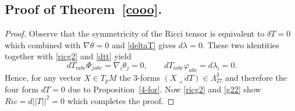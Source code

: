 \documentclass[10pt,british]{article}
\def\sb {{\nabla}}
\def\p{{\varphi}}
\begin{document}
\subsection{Proof of Theorem~\ref{cooo}.}
\begin{proof}
Observe that the symmetricity of the Ricci tensor is equivalent to $\delta T=0$  which combined with $\sb\theta=0$  and \eqref{deltaT} gives $d\lambda=0$. These two identities together with \eqref{ricg2} and \eqref{dtt} yield
\begin{equation}\label{nnt}
dT_{iabc}\Phi_{jabc}=\sb_i\theta_j=0, \qquad dT_{iabc}\p_{abc}=d\lambda_i=0.
\end{equation}
Hence,  for any vector  $X\in T_pM$ the 3-forms $(X\lrcorner dT)\in \Lambda^3_{27}$ and  therefore  the four form $dT=0$ due to Proposition~\ref{4-for}. Now \eqref{ricg2} and \eqref{g22} show $Ric=d||T||^2=0$ which completes the proof.
\end{proof}
\end{document}
